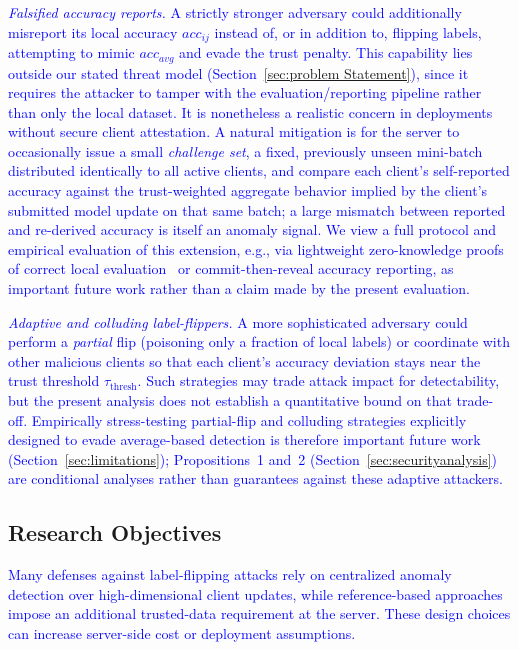 \documentclass[conference]{IEEEtran}
\begin{document}
\textcolor{blue}{\textit{Falsified accuracy reports.} A strictly stronger adversary could additionally misreport its local accuracy $acc_{ij}$ instead of, or in addition to, flipping labels, attempting to mimic $acc_{avg}$ and evade the trust penalty. This capability lies outside our stated threat model (Section~\ref{sec:problem Statement}), since it requires the attacker to tamper with the evaluation/reporting pipeline rather than only the local dataset. It is nonetheless a realistic concern in deployments without secure client attestation. A natural mitigation is for the server to occasionally issue a small \emph{challenge set}, a fixed, previously unseen mini-batch distributed identically to all active clients, and compare each client's self-reported accuracy against the trust-weighted aggregate behavior implied by the client's submitted model update on that same batch; a large mismatch between reported and re-derived accuracy is itself an anomaly signal. We view a full protocol and empirical evaluation of this extension, e.g., via lightweight zero-knowledge proofs of correct local evaluation~\cite{shen2024lfrppfl} or commit-then-reveal accuracy reporting, as important future work rather than a claim made by the present evaluation.}

\textcolor{blue}{\textit{Adaptive and colluding label-flippers.} A more sophisticated adversary could perform a \emph{partial} flip (poisoning only a fraction of local labels) or coordinate with other malicious clients so that each client's accuracy deviation stays near the trust threshold $\tau_{\text{thresh}}$. Such strategies may trade attack impact for detectability, but the present analysis does not establish a quantitative bound on that trade-off. Empirically stress-testing partial-flip and colluding strategies explicitly designed to evade average-based detection is therefore important future work (Section~\ref{sec:limitations}); Propositions~1 and~2 (Section~\ref{sec:securityanalysis}) are conditional analyses rather than guarantees against these adaptive attackers.}

\subsection{Research Objectives}
\textcolor{blue}{Many defenses against label-flipping attacks rely on centralized anomaly detection over high-dimensional client updates, while reference-based approaches impose an additional trusted-data requirement at the server. These design choices can increase server-side cost or deployment assumptions.}
\end{document}
